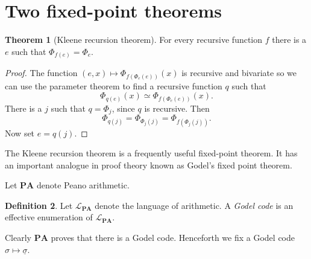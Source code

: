 \documentclass[12pt]{report}
\newcommand{\PA}{\mathbf{PA}}
\newcommand{\dfn}[1]{\emph{#1}\index{#1}}
\theoremstyle{definition}
\newtheorem{theorem}{Theorem}[chapter]
\newtheorem{definition}[theorem]{Definition}
\begin{document}
\section{Two fixed-point theorems}
\begin{theorem}[Kleene recursion theorem]
For every recursive function $f$ there is a $e$ such that $\Phi_{f(e)} = \Phi_e$.
\end{theorem}
\begin{proof}
The function $(e, x) \mapsto \Phi_{f(\Phi_e(e))}(x)$ is recursive and bivariate so we can use the parameter theorem to find a recursive function $q$ such that
$$\Phi_{q(e)}(x) \simeq \Phi_{f(\Phi_e(e))}(x).$$
There is a $j$ such that $q = \Phi_j$, since $q$ is recursive. Then
$$\Phi_{q(j)} = \Phi_{\Phi_j(j)} = \Phi_{f(\Phi_j(j))}.$$
Now set $e = q(j)$.
\end{proof}
The Kleene recursion theorem is a frequently useful fixed-point theorem. It has an important analogue in proof theory known as Godel's fixed point theorem.

Let $\PA$ denote Peano arithmetic.
\begin{definition}
  Let $\mathcal L_{\PA}$ denote the language of arithmetic. A \dfn{Godel code} is an effective enumeration of $\mathcal L_{\PA}$.
\end{definition}
Clearly $\PA$ proves that there is a Godel code. Henceforth we fix a Godel code $\sigma \mapsto \underline \sigma$.
\end{document}
